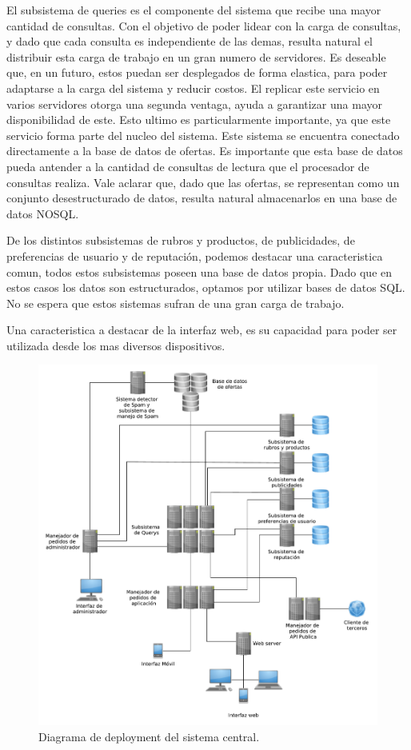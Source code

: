 El subsistema de queries es el componente del sistema que recibe una mayor cantidad de consultas. Con el objetivo de poder lidear con la carga de consultas, y dado que cada consulta es independiente de las demas, resulta natural el distribuir esta carga de trabajo en un gran numero de servidores. Es deseable que, en un futuro, estos puedan ser desplegados de forma elastica, para poder adaptarse a la carga del sistema y reducir costos. El replicar este servicio en varios servidores otorga una segunda ventaga, ayuda a garantizar una mayor disponibilidad de este. Esto ultimo es particularmente importante, ya que este servicio forma parte del nucleo del sistema.
Este sistema se encuentra conectado directamente a la base de datos de ofertas. Es importante que esta base de datos pueda antender a la cantidad de consultas de lectura que el procesador de consultas realiza. Vale aclarar que, dado que las ofertas, se representan como un conjunto desestructurado de datos, resulta natural almacenarlos en una base de datos NOSQL.

De los distintos subsistemas de rubros y productos, de publicidades, de preferencias de usuario y de reputaci\'on, podemos destacar una caracteristica comun, todos estos subsistemas poseen una base de datos propia. Dado que en estos casos los datos son estructurados, optamos por utilizar bases de datos SQL. No se espera que estos sistemas sufran de una gran carga de trabajo.

Una caracteristica a destacar de la interfaz web, es su capacidad para poder ser utilizada desde los mas diversos dispositivos.

\begin{figure}[H]
	\centering
	\includegraphics[width=\textwidth]{graficos/deploy/deploy_cont.pdf}
	\caption{Diagrama de deployment del sistema central.}
	\label{fig:deploy_query}
\end{figure}
